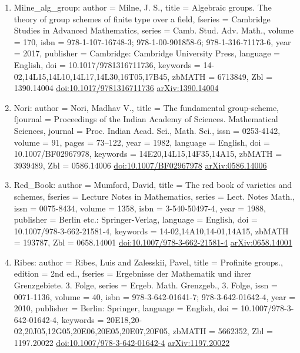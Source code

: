 \documentclass[11pt]{article}
\begin{document}
\begin{enumerate}[leftmargin=*]
  \item Milne\_alg\_group: author = Milne, J. S., title = Algebraic groups. The theory of group schemes of finite type over a field, fseries = Cambridge Studies in Advanced Mathematics, series = Camb. Stud. Adv. Math., volume = 170, isbn = 978-1-107-16748-3; 978-1-00-901858-6; 978-1-316-71173-6, year = 2017, publisher = Cambridge: Cambridge University Press, language = English, doi = 10.1017/9781316711736, keywords = 14-02,14L15,14L10,14L17,14L30,16T05,17B45, zbMATH = 6713849, Zbl = 1390.14004 \href{https://doi.org/10.1017/9781316711736}{doi:10.1017/9781316711736} \href{https://arxiv.org/abs/1390.14004}{arXiv:1390.14004}
  \item Nori: author = Nori, Madhav V., title = The fundamental group-scheme, fjournal = Proceedings of the Indian Academy of Sciences. Mathematical Sciences, journal = Proc. Indian Acad. Sci., Math. Sci., issn = 0253-4142, volume = 91, pages = 73--122, year = 1982, language = English, doi = 10.1007/BF02967978, keywords = 14E20,14L15,14F35,14A15, zbMATH = 3939489, Zbl = 0586.14006 \href{https://doi.org/10.1007/BF02967978}{doi:10.1007/BF02967978} \href{https://arxiv.org/abs/0586.14006}{arXiv:0586.14006}
  \item Red\_Book: author = Mumford, David, title = The red book of varieties and schemes, fseries = Lecture Notes in Mathematics, series = Lect. Notes Math., issn = 0075-8434, volume = 1358, isbn = 3-540-50497-4, year = 1988, publisher = Berlin etc.: Springer-Verlag, language = English, doi = 10.1007/978-3-662-21581-4, keywords = 14-02,14A10,14-01,14A15, zbMATH = 193787, Zbl = 0658.14001 \href{https://doi.org/10.1007/978-3-662-21581-4}{doi:10.1007/978-3-662-21581-4} \href{https://arxiv.org/abs/0658.14001}{arXiv:0658.14001}
  \item Ribes: author = Ribes, Luis and Zalesskii, Pavel, title = Profinite groups., edition = 2nd ed., fseries = Ergebnisse der Mathematik und ihrer Grenzgebiete. 3. Folge, series = Ergeb. Math. Grenzgeb., 3. Folge, issn = 0071-1136, volume = 40, isbn = 978-3-642-01641-7; 978-3-642-01642-4, year = 2010, publisher = Berlin: Springer, language = English, doi = 10.1007/978-3-642-01642-4, keywords = 20E18,20-02,20J05,12G05,20E06,20E05,20E07,20F05, zbMATH = 5662352, Zbl = 1197.20022 \href{https://doi.org/10.1007/978-3-642-01642-4}{doi:10.1007/978-3-642-01642-4} \href{https://arxiv.org/abs/1197.20022}{arXiv:1197.20022}

\end{enumerate}
\end{document}
